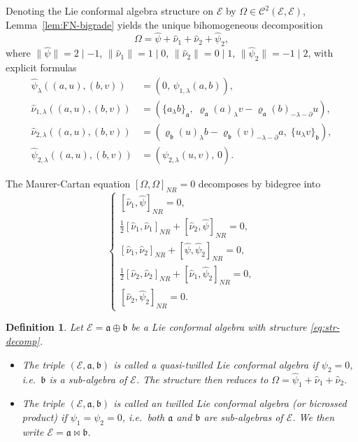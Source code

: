 \documentclass[a4paper,11pt]{article}
\def\Ep{\mathcal{E}}
\def\Vs{\mathfrak{a}}
\def\Ws{\mathfrak{b}}
\def\rep{\varrho}
\def\str{\Omega}
\def\smu{\widehat{\nu}_1}
\def\smv{\widehat{\nu}_2}
\def\shf{\widehat{\psi}}
\def\Cch{\mathscr{C}}
\def\la{\lambda}
\def\p{\partial}
\def\half{\tfrac{1}{2}}
\numberwithin{equation}{section}
\newtheorem{definition}[theorem]{Definition}
\begin{document}
Denoting the Lie conformal algebra structure on $\Ep$ by $\str\in\Cch^2(\Ep,\Ep)$,
Lemma~\ref{lem:FN-bigrade} yields the unique bihomogeneous decomposition
\begin{equation}\label{eq:str-decomp}
  \str = \shf + \smu + \smv + \widehat\psi_2,
\end{equation}
where $\|\shf\|=2\mid{-1}$, $\|\smu\|=1\mid 0$, $\|\smv\|=0\mid 1$,
$\|\widehat\psi_2\|=-1\mid 2$, with explicit formulas
\begin{align}
  \shf_\la((a,u),(b,v))
    &= (0,\,\psi_{1,\la}(a,b)),
    \label{eq:comp-psi1}\\
  \widehat{\nu}_{1,\la}((a,u),(b,v))
    &= (\{a_\la b\}_\Vs,\;
        \rep_\Vs(a)_\la v - \rep_\Vs(b)_{-\la-\p}u),
    \label{eq:comp-nu1}\\
  \widehat{\nu}_{2,\la}((a,u),(b,v))
    &= (\rep_\Ws(u)_\la b - \rep_\Ws(v)_{-\la-\p}a,\;
        \{u_\la v\}_\Ws),
    \label{eq:comp-nu2}\\
  \widehat\psi_{2,\la}((a,u),(b,v))
    &= (\psi_{2,\la}(u,v),\,0).
    \label{eq:comp-psi2}
\end{align}

The Maurer-Cartan equation $[\str,\str]_{NR}=0$ decomposes by bidegree into
\begin{equation}\label{eq:MC-system}
  \begin{cases}
    [\smu,\shf]_{NR} = 0, \\[3pt]
    \half[\smu,\smu]_{NR} + [\smv,\shf]_{NR} = 0, \\[3pt]
    [\smu,\smv]_{NR} + [\shf,\widehat\psi_2]_{NR} = 0, \\[3pt]
    \half[\smv,\smv]_{NR} + [\smu,\widehat\psi_2]_{NR} = 0, \\[3pt]
    [\smv,\widehat\psi_2]_{NR} = 0.
  \end{cases}
\end{equation}

\begin{definition}\label{def:twilled}
Let $\Ep=\Vs\oplus\Ws$ be a Lie conformal algebra with structure
\eqref{eq:str-decomp}.
\begin{itemize}
  \item[\rm(i)] The triple $(\Ep,\Vs,\Ws)$ is called a
    \textit{quasi-twilled Lie conformal  algebra} if $\psi_2=0$,
    i.e.\ $\Ws$ is a sub-algebra of $\Ep$. The structure then reduces to
    $\str=\shf_1+\smu+\smv$.
  \item[\rm(ii)] The triple $(\Ep,\Vs,\Ws)$ is called an
    \textit{twilled Lie conformal  algebra} (or \textit{bicrossed
    product}) if $\psi_1=\psi_2=0$, i.e.\ both $\Vs$ and $\Ws$ are
    sub-algebras of $\Ep$.  We then write $\Ep=\Vs\bowtie\Ws$.
\end{itemize}
\end{definition}
\end{document}
